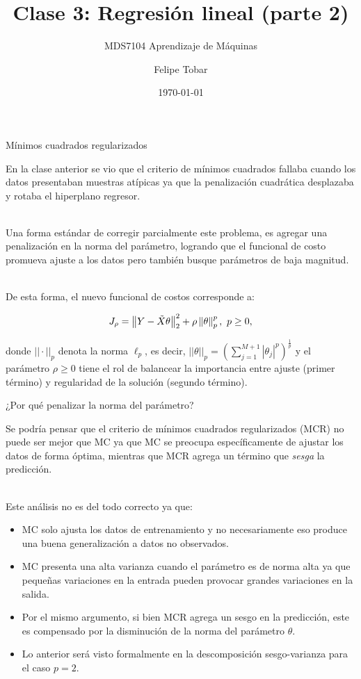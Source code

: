 \documentclass[handout, 9pt]{beamer}
\title{Clase 3: Regresión lineal (parte 2)}
\subtitle{MDS7104 Aprendizaje de Máquinas}
\date{\today}
\author{Felipe Tobar}
\institute{Iniciativa de Datos e Inteligencia Artificial\\Universidad de Chile}
\begin{document}
\begin{frame}
  \titlepage
\end{frame}

\begin{frame}{Mínimos cuadrados regularizados}

En la clase anterior se vio que el criterio de mínimos cuadrados fallaba cuando los datos presentaban muestras atípicas ya que la penalización cuadrática desplazaba y rotaba el hiperplano regresor.\\~\ \pause

Una forma estándar de corregir parcialmente este problema, es agregar una penalización en la norma del parámetro, logrando que el funcional de costo promueva ajuste a los datos pero también busque parámetros de baja magnitud.\\~\ \pause

De esta forma, el nuevo funcional de costos corresponde a:

\begin{equation*}
	J_\rho = \left\lVert Y-\tilde{X}\theta\right\rVert_2^2 + \rho\left\lVert\theta\right\rVert_p^p,\ p\geq 0,
\end{equation*}

donde $||\cdot||_p$ denota la norma $\ell_p$, es decir, $||\theta||_p=\left(\sum\limits_{j=1}^{M+1}|\theta_j|^p\right)^\frac{1}{p}$ y el parámetro $\rho\geq0$ tiene el rol de balancear la importancia entre ajuste (primer término) y regularidad de la solución (segundo término).
	 
\end{frame}

\begin{frame}{¿Por qué penalizar la norma del parámetro?}

Se podría pensar que el criterio de mínimos cuadrados regularizados (MCR) no puede ser mejor que MC ya que MC se preocupa específicamente de ajustar los datos de forma óptima, mientras que MCR agrega un término que \emph{sesga} la predicción.\\~\ \pause

Este análisis no es del todo correcto ya que: 

\begin{itemize}
	\item MC solo ajusta los datos de entrenamiento y no necesariamente eso produce una buena generalización a datos no observados.\pause
	\item MC presenta una alta varianza cuando el parámetro es de norma alta ya que pequeñas variaciones en la entrada pueden provocar grandes variaciones en la salida.\pause
	\item Por el mismo argumento, si bien MCR agrega un sesgo en la predicción, este es compensado por la disminución de la norma del parámetro $\theta$.\pause
	\item Lo anterior será visto formalmente en la descomposición sesgo-varianza para el caso $p=2$.
\end{itemize}
	
\end{frame}
\end{document}
